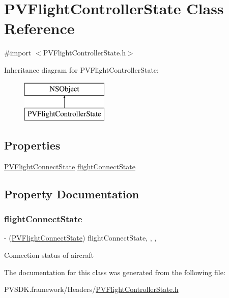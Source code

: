 \hypertarget{interface_p_v_flight_controller_state}{}\section{P\+V\+Flight\+Controller\+State Class Reference}
\label{interface_p_v_flight_controller_state}


{\ttfamily \#import $<$P\+V\+Flight\+Controller\+State.\+h$>$}

Inheritance diagram for P\+V\+Flight\+Controller\+State\+:\begin{figure}[H]
\begin{center}
\leavevmode
\includegraphics[height=2.000000cm]{interface_p_v_flight_controller_state}
\end{center}
\end{figure}
\subsection*{Properties}
\begin{DoxyCompactItemize}
\item 
\hyperlink{_p_v_flight_controller_state_8h_a114bcb647c32c73c1dc06e9a9e302492}{P\+V\+Flight\+Connect\+State} \hyperlink{interface_p_v_flight_controller_state_a66936b1d3cea231fde9bcdac3492319f}{flight\+Connect\+State}
\end{DoxyCompactItemize}


\subsection{Property Documentation}
\mbox{\label{interface_p_v_flight_controller_state_a66936b1d3cea231fde9bcdac3492319f}} 
\subsubsection{\texorpdfstring{flight\+Connect\+State}{flightConnectState}}
{\footnotesize\ttfamily -\/ (\hyperlink{_p_v_flight_controller_state_8h_a114bcb647c32c73c1dc06e9a9e302492}{P\+V\+Flight\+Connect\+State}) flight\+Connect\+State\hspace{0.3cm}{\ttfamily [read]}, {\ttfamily [write]}, {\ttfamily [nonatomic]}, {\ttfamily [assign]}}

Connection status of aircraft 

The documentation for this class was generated from the following file\+:\begin{DoxyCompactItemize}
\item 
P\+V\+S\+D\+K.\+framework/\+Headers/\hyperlink{_p_v_flight_controller_state_8h}{P\+V\+Flight\+Controller\+State.\+h}\end{DoxyCompactItemize}
